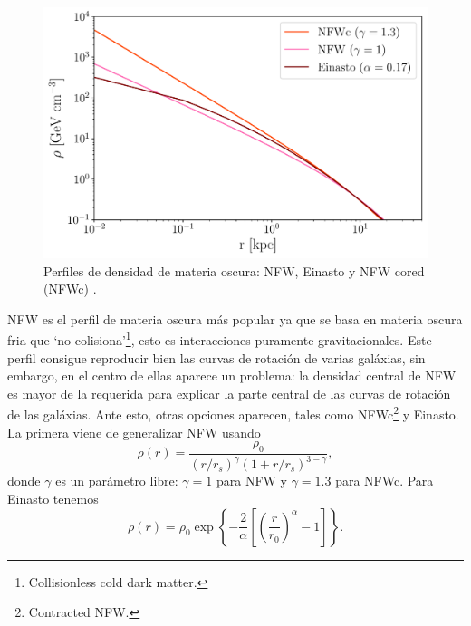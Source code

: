 \begin{figure}[h]
\centering
\includegraphics[scale=0.5]{Images/profiles.pdf}
\caption[\hspace{0.1in}Perfiles de densidad de materia oscura]{Perfiles de densidad de materia oscura: NFW, Einasto y NFW cored (NFWc) \cite{Angel:2023rdd}.}
\label{profiles}
\end{figure}

NFW es el perfil de materia oscura más popular ya que se basa en materia oscura fria que `no colisiona'\footnote{Collisionless cold dark matter.}, esto es interacciones puramente gravitacionales. Este perfil consigue reproducir bien las curvas de rotación de varias galáxias, sin embargo, en el centro de ellas aparece un problema: la densidad central de NFW es mayor de la requerida para explicar la parte central de las curvas de rotación de las galáxias. Ante esto, otras opciones aparecen, tales como NFWc\footnote{Contracted NFW.} y Einasto. La primera viene de generalizar NFW usando
\begin{equation}
\rho (r) = \frac{\rho_0}{(r/r_s)^\gamma (1+r/r_s)^{3-\gamma}},
\end{equation}
donde $\gamma$ es un parámetro libre: $\gamma =1$  para NFW y $\gamma = 1.3$ para NFWc. Para Einasto tenemos
\begin{equation}
\rho (r) = \rho_0 \exp \left\{ - \frac{2}{\alpha} \left[ \left( \frac{r}{r_0}\right)^\alpha -1 \right] \right\}.
\end{equation} 

